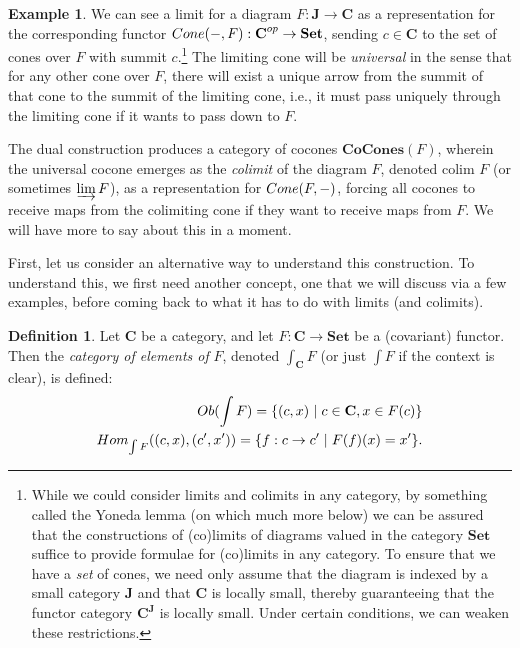 \documentclass[a4paper]{book}
\theoremstyle{definition}
\newtheorem{example}{Example}[section]
\theoremstyle{definition}
\newtheorem{definition}{Definition}[section]
\theoremstyle{definition}
\theoremstyle{theorem}
\theoremstyle{definition}
\begin{document}
\begin{example}
	We can see a limit for a diagram $F: \textbf{J} \rightarrow \textbf{C}$ as a representation for the corresponding functor $Cone(\--, F): \textbf{C}^{op} \rightarrow \textbf{Set}$, sending $c \in \textbf{C}$ to the set of cones over $F$ with summit $c$.\footnote{While we could consider limits and colimits in any category, by something called the Yoneda lemma (on which much more below) we can be assured that the constructions of (co)limits of diagrams valued in the category $\textbf{Set}$ suffice to provide formulae for (co)limits in any category. To ensure that we have a \textit{set} of cones, we need only assume that the diagram is indexed by a small category $\textbf{J}$ and that $\textbf{C}$ is locally small, thereby guaranteeing that the functor category $\textbf{C}^{\textbf{J}}$ is locally small. Under certain conditions, we can weaken these restrictions.} The limiting cone will be \textit{universal} in the sense that for any other cone over $F$, there will exist a unique arrow from the summit of that cone to the summit of the limiting cone, i.e., it must pass uniquely through the limiting cone if it wants to pass down to $F$. 
	\par 
	The dual construction produces a category of cocones $\textbf{CoCones}(F)$, wherein the universal cocone emerges as the \textit{colimit} of the diagram $F$, denoted $\text{colim } F$ (or sometimes $\varinjlim F$), as a representation for $Cone(F, \--)$, forcing all cocones to receive maps from the colimiting cone if they want to receive maps from $F$. We will have more to say about this in a moment. \par 
	First, let us consider an alternative way to understand this construction. To understand this, we first need another concept, one that we will discuss via a few examples, before coming back to what it has to do with limits (and colimits). 
	\begin{definition}
		Let \textbf{C} be a category, and let $F: \textbf{C} \rightarrow \textbf{Set}$ be a (covariant) functor. Then the \textit{category of elements of} $F$, denoted $\int_{\textbf{C}} F$ (or just $\int F$ if the context is clear), is defined: 
	\begin{equation}
		\begin{split}
		Ob(\int F) = \{(c, x) \hspace*{0.3em}| \hspace*{0.3em} c \in \textbf{C}, x \in F(c) \} \\
		Hom_{\int F}((c,x), (c', x')) = \{f: c \rightarrow c' \hspace*{0.3em}| \hspace*{0.3em} F(f)(x) = x'\}.

\end{split}
\end{equation}
\end{definition}
\end{example}
\end{document}
